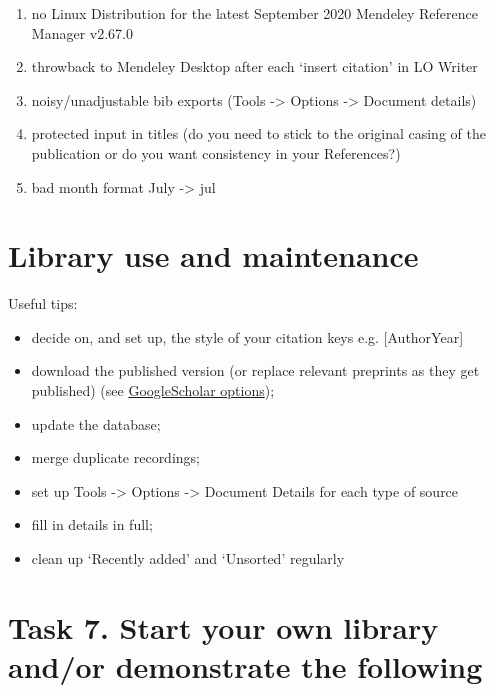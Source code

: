 \documentclass[a4paper,11pt]{article}
\begin{document}
\begin{tcolorbox}[width=\textwidth, nobeforeafter,valign=center, fonttitle=\Large\bfseries,title=My current issues with Mendeley]
	\begin{enumerate}
		\item no Linux Distribution for the latest September 2020 Mendeley Reference Manager v2.67.0
		\item throwback to Mendeley Desktop after each `insert citation' in LO Writer
		\item noisy/unadjustable bib exports (Tools -> Options -> Document details)
		\item protected input in titles (do you need to stick to the original casing of the publication or do you want consistency in your References?)
		\item bad month format July -> jul
	\end{enumerate}
\end{tcolorbox}

\section{Library use and maintenance}

Useful tips: 

\begin{itemize}
	\item decide on, and set up, the style of your citation keys e.g. [AuthorYear]
	\item download the published version (or replace relevant preprints as they get published) (see \href{https://scholar.google.com/scholar?hl=en\&as\_sdt=0\%2C5\&q=Controlling+Text+Complexity+in+Neural+Machine+Translation\&btnG=}{GoogleScholar options});
	\item update the database;
	\item merge duplicate recordings;
	\item set up Tools -> Options -> Document Details for each type of source
	\item fill in details in full;
	\item clean up `Recently added' and `Unsorted' regularly 
\end{itemize}


\section*{Task 7. Start your own library and/or demonstrate the following}
\label{task}
\end{document}
